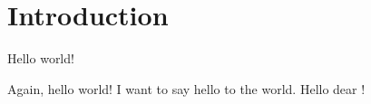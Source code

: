 \documentclass[10pt,a4paper,twoside]{book}
\begin{document}
\maketitle

\chapter{Introduction}

Hello world!

Again, hello world!
I want to say hello to the world.
Hello dear ! 
\end{document}
